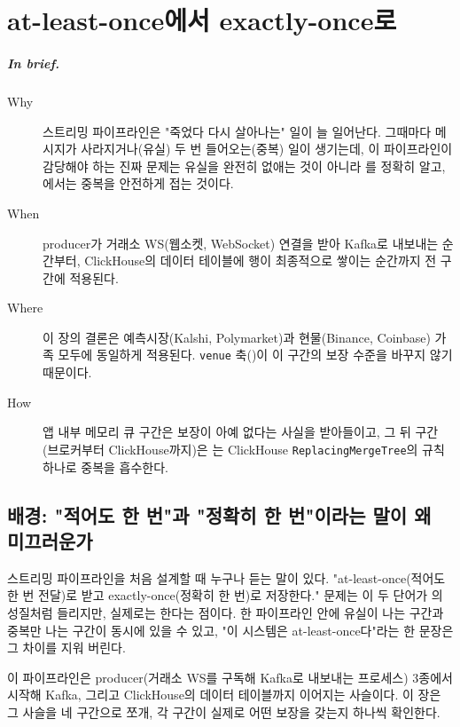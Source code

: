 \chapter{at-least-once에서 exactly-once로}
\label{ch:delivery}

\paragraph{In brief.}
\begin{description}
  \item[Why] 스트리밍 파이프라인은 "죽었다 다시 살아나는" 일이 늘 일어난다. 그때마다
    메시지가 사라지거나(유실) 두 번 들어오는(중복) 일이 생기는데, 이 파이프라인이
    감당해야 하는 진짜 문제는 유실을 완전히 없애는 것이 아니라 를 정확히 알고, 에서는 중복을 안전하게 접는 것이다.
  \item[When] producer가 거래소 WS(웹소켓, WebSocket) 연결을 받아 Kafka로 내보내는
    순간부터, ClickHouse의 데이터 테이블에 행이 최종적으로 쌓이는 순간까지 전 구간에
    적용된다.
  \item[Where] 이 장의 결론은 예측시장(Kalshi, Polymarket)과 현물(Binance, Coinbase)
    가족 모두에 동일하게 적용된다. \texttt{venue} 축()이 이 구간의
    보장 수준을 바꾸지 않기 때문이다.
  \item[How] 앱 내부 메모리 큐 구간은 보장이 아예 없다는 사실을 받아들이고, 그 뒤
    구간(브로커부터 ClickHouse까지)은 는
    ClickHouse \texttt{ReplacingMergeTree}의 규칙 하나로 중복을 흡수한다.
\end{description}

\section{배경: "적어도 한 번"과 "정확히 한 번"이라는 말이 왜 미끄러운가}
\label{sec:delivery-vocab}

스트리밍 파이프라인을 처음 설계할 때 누구나 듣는 말이 있다. "at-least-once(적어도
한 번 전달)로 받고 exactly-once(정확히 한 번)로 저장한다." 문제는 이 두 단어가
의 성질처럼 들리지만, 실제로는 한다는
점이다. 한 파이프라인 안에 유실이 나는 구간과 중복만 나는 구간이 동시에 있을 수 있고,
"이 시스템은 at-least-once다"라는 한 문장은 그 차이를 지워 버린다.

이 파이프라인은 producer(거래소 WS를 구독해 Kafka로 내보내는 프로세스) 3종에서
시작해 Kafka, 그리고 ClickHouse의 데이터 테이블까지 이어지는 사슬이다. 이 장은 그
사슬을 네 구간으로 쪼개, 각 구간이 실제로 어떤 보장을 갖는지 하나씩 확인한다.

